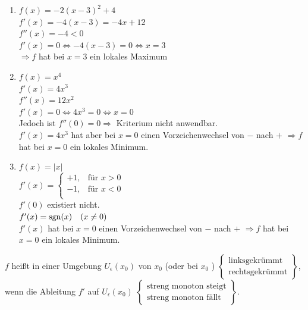 \Bsp
\begin{enumerate}
	\item $f(x) = -2(x-3)^2+4$\\
	$f'(x) = -4(x-3) = -4x+12$\\
	$f''(x) = -4<0$\\
	$f'(x) = 0 \Leftrightarrow -4(x-3) = 0 \Leftrightarrow x=3$\\
	$\Rightarrow f$ hat bei $x=3$ ein lokales Maximum
	
	\item $f(x) = x^4$\\
	$f'(x) = 4x^3$\\
	$f''(x) = 12x^2$\\
	$f'(x) = 0 \Leftrightarrow 4x^3 = 0 \Leftrightarrow x = 0$\\
	Jedoch ist $f''(0)=0\Rightarrow$ Kriterium nicht anwendbar.\\
	$f'(x) = 4x^3$ hat aber bei $x=0$ einen Vorzeichenwechsel von $-$ nach $+$ $\Rightarrow f$ hat bei $x=0$ ein lokales Minimum.
	
	\item $f(x) = |x|$\\
	$f'(x) = \left\{\begin{array}{ll}
	+1,&\text{für }x>0\\
	-1,&\text{für }x<0\\
	\end{array}\right.$\\
	$f'(0)$ existiert nicht.\\
	$f'(x) = \mathbin\text{sgn}(x)\quad(x\ne0)$\\
	$f'(x)$ hat bei $x=0$ einen Vorzeichenwechsel von $-$ nach $+$ $\Rightarrow f$ hat bei $x=0$ ein lokales Minimum.
\end{enumerate}

\Def $f$ heißt in einer Umgebung $U_\epsilon(x_0)$ von $x_0$ (oder bei $x_0$ ) $\left\{\begin{array}{c}\text{linksgekrümmt}\\\text{rechtsgekrümmt}\end{array}\right\}$, wenn die Ableitung $f'$ auf $U_\epsilon(x_0)$ $\left\{\begin{array}{c}\text{streng monoton steigt}\\\text{streng monoton fällt}\end{array}\right\}$.

